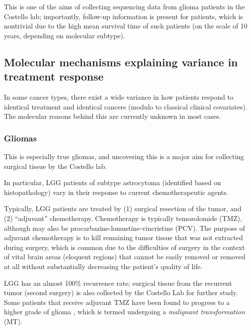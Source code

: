         This is one of the aims of collecting sequencing data from glioma patients in the
        Costello lab; importantly, follow-up information is present
        for patients, which is nontrivial due to the high mean
        survival time of such patients (on the scale of 10 years,
        depending on molecular subtype).

        \subsection{Molecular mechanisms explaining variance in treatment
          response}

        In some cancer types, there exist a wide variance in how
        patients respond to identical treatment and identical cancers
        (modulo to classical clinical covariates). The molecular
        reasons behind this are currently unknown in most cases.

        \subsubsection{Gliomas}

        This is especially true gliomas, and uncovering this is a
        major aim for collecting surgical tissue by the Costello lab.

        In particular, LGG patients of subtype astrocytoma (identified
        based on histopathology) vary in their response to current
        chemotherapeutic agents.

        Typically, LGG patients are treated by (1) surgical resection
        of the tumor, and (2) ``adjuvant'' chemotherapy. Chemotherapy
        is typically temozolomide (TMZ), although may also be
        procarbazine-lomustine-vincristine (PCV). The purpose of adjuvant chemotherapy is to kill remaining tumor tissue
        that was not extracted during surgery, which is common due to
        the difficulties of surgery in the context of vital brain
        areas (eloquent regions) that cannot be easily removed or removed at all without
        substantially decreasing the patient's quality of life.

        LGG has an almost 100\% recurrence rate; surgical tissue
        from the recurrent tumor (second surgery) is also collected by the Costello Lab
        for further study. Some patients that receive adjuvant TMZ have been found to
       progress to a higher grade of glioma
       \cite{johnson_mutational_2014}, which is termed undergoing a
       \textit{malignant transformation} (MT).

